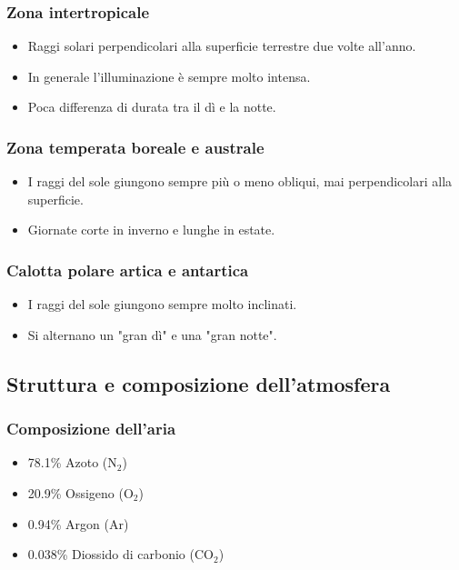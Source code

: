 \documentclass{article}
\begin{document}
\subsubsection{Zona intertropicale}
    \begin{itemize}
        \item Raggi solari perpendicolari alla superficie terrestre due volte all'anno.
        \item In generale l'illuminazione è sempre molto intensa.
        \item Poca differenza di durata tra il dì e la notte.
    \end{itemize}

\subsubsection{Zona temperata boreale e australe}
    \begin{itemize}
        \item I raggi del sole giungono sempre più o meno obliqui, mai perpendicolari alla superficie.
        \item Giornate corte in inverno e lunghe in estate.
    \end{itemize}

\subsubsection{Calotta polare artica e antartica}
    \begin{itemize}
        \item I raggi del sole giungono sempre molto inclinati.
        \item Si alternano un "gran dì" e una "gran notte".
    \end{itemize}

\subsection{Struttura e composizione dell'atmosfera}
\subsubsection{Composizione dell'aria}
\begin{itemize}
    \item 78.1\% Azoto (N$_2$)
    \item 20.9\% Ossigeno (O$_2$)
    \item 0.94\% Argon (Ar)
    \item 0.038\% Diossido di carbonio (CO$_2$)
\end{itemize}
\end{document}
